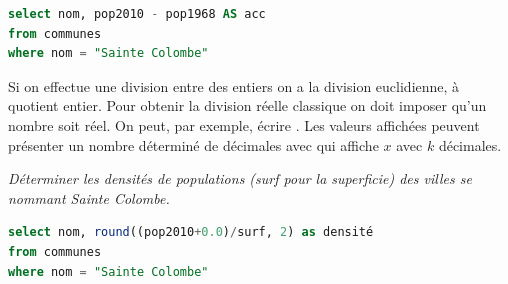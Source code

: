 \begin{Answer}
\begin{lstlisting}[language=SQL]
select nom, pop2010 - pop1968 AS acc
from communes  
where nom = "Sainte Colombe"
\end{lstlisting}
\end{Answer}
Si on effectue une division entre des entiers on a la division euclidienne, à quotient entier. Pour obtenir la division réelle classique on doit imposer qu'un nombre soit réel. On peut, par exemple, écrire .
Les valeurs affichées peuvent présenter un nombre déterminé de décimales avec  qui affiche $x$ avec $k$ décimales.
\begin{Exercise}
\it Déterminer les densités de populations ({\type surf} pour la superficie) des villes se nommant Sainte Colombe.
\end{Exercise}
\begin{Answer}
\begin{lstlisting}[language=SQL]
select nom, round((pop2010+0.0)/surf, 2) as densité
from communes  
where nom = "Sainte Colombe"
\end{lstlisting}
\end{Answer}
